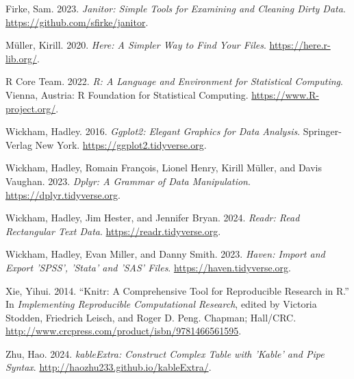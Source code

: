 \documentclass[
  letterpaper,
  DIV=11,
  numbers=noendperiod]{scrartcl}
\newlength{\cslhangindent}
\newenvironment{CSLReferences}[2] %
 {\begin{list}{}{%
  \setlength{\itemindent}{0pt}
  \setlength{\leftmargin}{0pt}
  \setlength{\parsep}{0pt}
  \ifodd #1
   \setlength{\leftmargin}{\cslhangindent}
   \setlength{\itemindent}{-1\cslhangindent}
  \fi
  \setlength{\itemsep}{#2\baselineskip}}}
 {\end{list}}
\begin{document}
\label{refs}
\begin{CSLReferences}{1}{0}
Firke, Sam. 2023. \emph{Janitor: Simple Tools for Examining and Cleaning
Dirty Data}. \url{https://github.com/sfirke/janitor}.

Müller, Kirill. 2020. \emph{Here: A Simpler Way to Find Your Files}.
\url{https://here.r-lib.org/}.

R Core Team. 2022. \emph{R: A Language and Environment for Statistical
Computing}. Vienna, Austria: R Foundation for Statistical Computing.
\url{https://www.R-project.org/}.

Wickham, Hadley. 2016. \emph{Ggplot2: Elegant Graphics for Data
Analysis}. Springer-Verlag New York.
\url{https://ggplot2.tidyverse.org}.

Wickham, Hadley, Romain François, Lionel Henry, Kirill Müller, and Davis
Vaughan. 2023. \emph{Dplyr: A Grammar of Data Manipulation}.
\url{https://dplyr.tidyverse.org}.

Wickham, Hadley, Jim Hester, and Jennifer Bryan. 2024. \emph{Readr: Read
Rectangular Text Data}. \url{https://readr.tidyverse.org}.

Wickham, Hadley, Evan Miller, and Danny Smith. 2023. \emph{Haven: Import
and Export 'SPSS', 'Stata' and 'SAS' Files}.
\url{https://haven.tidyverse.org}.

Xie, Yihui. 2014. {``Knitr: A Comprehensive Tool for Reproducible
Research in {R}.''} In \emph{Implementing Reproducible Computational
Research}, edited by Victoria Stodden, Friedrich Leisch, and Roger D.
Peng. Chapman; Hall/CRC.
\url{http://www.crcpress.com/product/isbn/9781466561595}.

Zhu, Hao. 2024. \emph{kableExtra: Construct Complex Table with 'Kable'
and Pipe Syntax}. \url{http://haozhu233.github.io/kableExtra/}.

\end{CSLReferences}
\end{document}
